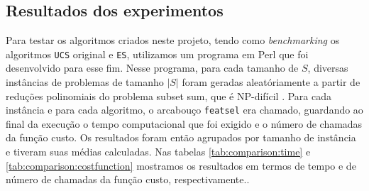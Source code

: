 \documentclass[12pt]{article}
\begin{document}


%
%
\subsection{Resultados dos experimentos} \label{sec:atividades:resultados}
Para testar os algoritmos criados neste projeto, tendo como {\em benchmarking} os algoritmos {\tt UCS} original e {\tt ES}, utilizamos um programa em Perl que foi desenvolvido para esse fim. Nesse programa, para cada tamanho de $S$, diversas instâncias de problemas de tamanho $|S|$ foram geradas aleatóriamente a partir de reduções polinomiais do problema subset sum, que é NP-difícil \cite{msreis thesis}. Para cada instância e para cada algoritmo, o arcabouço {\tt featsel} era chamado, guardando ao final da execução o tempo computacional que foi exigido e o número de chamadas da função custo. Os resultados foram então agrupados por tamanho de instância e tiveram suas médias calculadas. Nas tabelas \ref{tab:comparison:time} e \ref{tab:comparison:costfunction} mostramos os resultados em termos de tempo e de número de chamadas da função custo, respectivamente..





%
%
%
%
%
%
%
\end{document}
